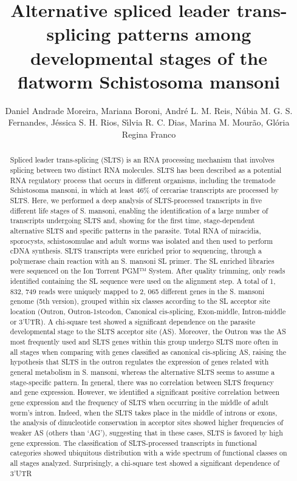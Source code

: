 \documentclass[twoside]{article}
\title{\vspace{-15mm}\fontsize{24pt}{10pt}\selectfont\textbf{ Alternative spliced leader trans-splicing patterns among developmental stages of the flatworm Schistosoma mansoni }} %
\author{ Daniel Andrade Moreira, Mariana Boroni, Andr\'e L. M. Reis, N\'ubia M. G. S. Fernandes, J\'essica S. H. Rios, S\'{\i}lvia R. C. Dias, Marina M. Mour\~ao, Gl\'oria Regina Franco }
\affil{ Universidade Federal de Minas Gerais }
\date{}
\begin{document}
  
  
  \maketitle %
  
  
  \thispagestyle{fancy} %
  
  
  \begin{abstract}
  Spliced leader trans-splicing (SLTS) is an RNA processing mechanism that involves splicing between two distinct RNA molecules. SLTS has been described as a potential RNA regulatory process that occurs in different organisms,  including the trematode Schistosoma mansoni,  in which at least 46\% of cercariae transcripts are processed by SLTS. Here,  we performed a deep analysis of SLTS-processed transcripts in five different life stages of S. mansoni,  enabling the identification of a large number of transcripts undergoing SLTS and,  showing for the first time,  stage-dependent alternative SLTS and specific patterns in the parasite. Total RNA of miracidia,  sporocysts,  schistosomulae and adult worms was isolated and then used to perform cDNA synthesis. SLTS transcripts were enriched prior to sequencing,  through a polymerase chain reaction with an S. mansoni SL primer. The SL enriched libraries were sequenced on the Ion Torrent PGM™ System. After quality trimming,  only reads identified containing the SL sequence were used on the alignment step. A total of 1, 832, 749 reads were uniquely mapped to 2, 065 different genes in the S. mansoni genome (5th version),  grouped within six classes according to the SL acceptor site location (Outron,  Outron-1stcodon,  Canonical cis-splicing,  Exon-middle,  Intron-middle or 3’UTR). A chi-square test showed a significant dependence on the parasite developmental stage to the SLTS acceptor site (AS). Moreover,  the Outron was the AS most frequently used and SLTS genes within this group undergo SLTS more often in all stages when comparing with genes classified as canonical cis-splicing AS,  raising the hypothesis that SLTS in the outron regulates the expression of genes related with general metabolism in S. mansoni,  whereas the alternative SLTS  seems to assume a stage-specific pattern. In general,  there was no correlation between SLTS frequency and gene expression. However,  we identified a significant positive correlation between gene expression and the frequency of SLTS when occurring in the middle of adult worm's intron. Indeed,  when the SLTS takes place in the middle of introns or exons,  the analysis of dinucleotide conservation in acceptor sites showed higher frequencies of weaker AS (others than ‘AG’),  suggesting that in these cases,  SLTS is favored by high gene expression. The classification of SLTS-processed transcripts in functional categories showed ubiquitous distribution with a wide spectrum of functional classes on all stages analyzed. Surprisingly,  a chi-square test showed a significant dependence of 3’UTR 
\end{abstract}
\end{document}
